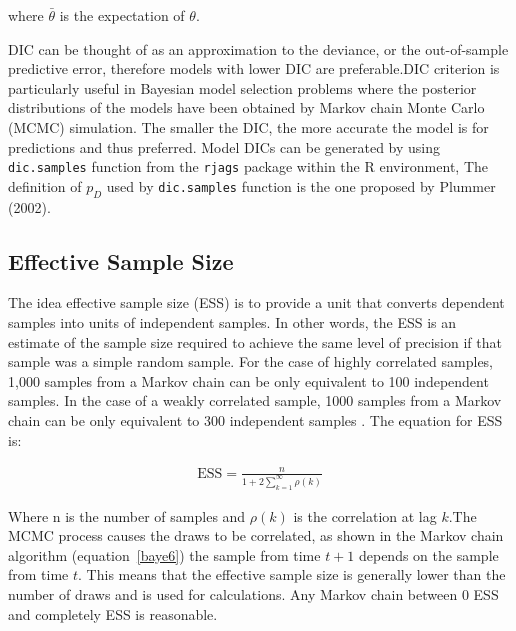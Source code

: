  where $\bar{\theta}$ is the expectation of $\theta$.
 
 \newpara
 
 DIC can be thought of as an approximation to the deviance, or the out-of-sample predictive error, therefore models with lower DIC are preferable.DIC criterion is particularly useful in Bayesian model selection problems where the posterior distributions of the models have been obtained by Markov chain Monte Carlo (MCMC) simulation. The smaller the DIC, the more accurate the model is for predictions and thus preferred. Model DICs can be generated by using \texttt{dic.samples} function from the \texttt{rjags} package within the R environment, The definition of $p_D$ used by \texttt{dic.samples} function is the one proposed by Plummer (2002).

\subsection{Effective Sample Size}

The idea effective sample size (ESS) is to provide a unit that converts dependent samples into units of independent samples. In other words, the ESS is an estimate of the sample size required to achieve the same level of precision if that sample was a simple random sample. For the case of highly correlated samples, 1,000 samples from a Markov chain can be only equivalent to 100 independent samples. In the case of a weakly correlated sample, 1000 samples from a Markov chain can be only equivalent to 300 independent samples \citep{Cook17, kass1998markov}. The equation for ESS is:

\begin{equation} \label{ESS2}
\begin{aligned}
\mbox{ESS} = \frac{n}{1 + 2\sum_{k=1}^\infty \rho(k)}
\end{aligned}
\end{equation}

Where n is the number of samples and $\rho(k)$ is the correlation at lag $k$.The MCMC process causes the draws to be correlated, as shown in the Markov chain algorithm (equation~\ref{baye6}) the sample from time $t + 1$ depends on the sample from time $t$. This means that the effective sample size is generally lower than the number of draws and is used for calculations. Any Markov chain between 0 ESS and completely ESS is reasonable.


